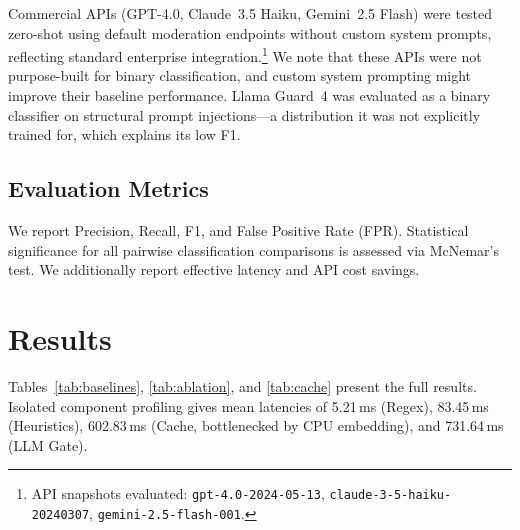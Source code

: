 \documentclass[conference]{IEEEtran}
\begin{document}
Commercial APIs (GPT-4.0, Claude~3.5 Haiku, Gemini~2.5 Flash) were tested
zero-shot using default moderation endpoints without custom system
prompts, reflecting standard enterprise integration.\footnote{API
snapshots evaluated: \texttt{gpt-4.0-2024-05-13},
\texttt{claude-3-5-haiku-20240307}, \texttt{gemini-2.5-flash-001}.}
We note that these APIs were not purpose-built for binary
classification, and custom system prompting might improve their
baseline performance. Llama Guard~4
was evaluated as a binary classifier on structural prompt
injections---a distribution it was not explicitly trained for, which
explains its low F1.

\subsection{Evaluation Metrics}

We report Precision, Recall, F1, and False Positive Rate (FPR).
Statistical significance for all pairwise classification comparisons is assessed via McNemar's test. We
additionally report effective latency and API cost savings.



\section{Results}

Tables~\ref{tab:baselines}, \ref{tab:ablation}, and
\ref{tab:cache} present the full results. Isolated
component profiling gives mean latencies of 5.21\,ms (Regex),
83.45\,ms (Heuristics), 602.83\,ms (Cache, bottlenecked by CPU
embedding), and 731.64\,ms (LLM Gate).
\end{document}
